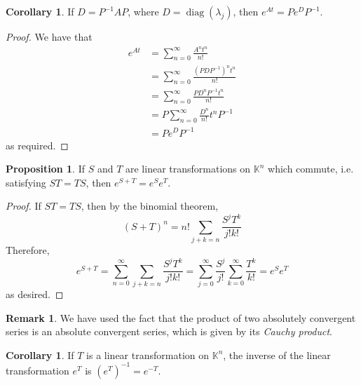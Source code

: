 \documentclass[11pt]{book}
\theoremstyle{definition}\newtheorem{definition}[subsection]{Definition}
\theoremstyle{definition}\newtheorem{example}[subsection]{Example}
\theoremstyle{definition}\newtheorem{notation}[subsection]{Notation}
\theoremstyle{definition}\newtheorem{remark}[subsection]{Remark}
\theoremstyle{theorem}\newtheorem{theorem}[subsection]{Theorem}
\theoremstyle{theorem}\newtheorem{lemma}[subsection]{Lemma}
\theoremstyle{theorem}\newtheorem{proposition}[subsection]{Proposition}
\theoremstyle{theorem}\newtheorem{corollary}[subsection]{Corollary}
\theoremstyle{theorem}\newtheorem{case}{Case}
\theoremstyle{remark}\newtheorem{subcase}{Subcase}[case]
\newcommand{\K}{\mathbb{K}}
\DeclareMathOperator{\diag}{diag}
\begin{document}
\begin{corollary}\label{corollary:1.4.7}
    If $D = P^{-1}AP$, where $D = \diag(\lambda_j)$, then $e^{At} = Pe^DP^{-1}$.
\end{corollary}

\begin{proof}
    We have that
    \begin{align*}
        e^{At} &= \sum_{n = 0}^{\infty} \frac{A^n t^n}{n!} \\
        &= \sum_{n = 0}^{\infty} \frac{(PDP^{-1})^n t^n}{n!} \\
        &= \sum_{n = 0}^{\infty} \frac{PD^nP^{-1}t^n}{n!} \\
        &= P\sum_{n = 0}^{\infty} \frac{D^n}{n!}t^n P^{-1} \\
        &= Pe^D P^{-1}
    \end{align*}
    as required.
\end{proof}

\begin{proposition}\label{proposition:1.4.8}
    If $S$ and $T$ are linear transformations on $\K^n$ which commute, i.e. satisfying $ST = TS$, then $e^{S + T} = e^S e^T$.
\end{proposition}

\begin{proof}
    If $ST = TS$, then by the binomial theorem,
    \begin{equation*}
        (S + T)^n = n!\sum_{j + k = n} \frac{S^j T^k}{j!k!}
    \end{equation*}
    Therefore,
    \begin{equation*}
        e^{S + T} = \sum_{n = 0}^{\infty} \sum_{j + k = n} \frac{S^jT^k}{j!k!} = \sum_{j = 0}^{\infty} \frac{S^j}{j!} \sum_{k = 0}^{\infty} \frac{T^k}{k!} = e^S e^T
    \end{equation*}
    as desired.
\end{proof}

\begin{remark}\label{remark:1.4.9}
    We have used the fact that the product of two absolutely convergent series is an absolute convergent series, which is given by its \emph{Cauchy product}.
\end{remark}

\begin{corollary}\label{corollary:1.4.10}
    If $T$ is a linear transformation on $\K^n$, the inverse of the linear transformation $e^T$ is $(e^T)^{-1} = e^{-T}$.
\end{corollary}
\end{document}
